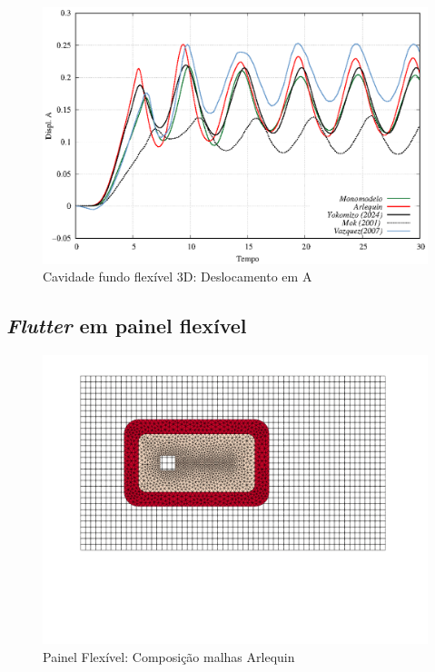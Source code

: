 \documentclass[tese_patricia]{subfiles}
\begin{document}
\begin{figure}[htb!]
	\centering 
	\includegraphics[scale=1.0,trim=0cm 0cm 0cm 0cm, clip=true]{Imagens/Cap7/Cav3dDisplacement.eps}	
	\caption{Cavidade fundo flexível 3D: Deslocamento em A}
	\label{fig:cavidadeFF2d_DeslocamentoemA}
\end{figure}


\subsection{\textit{Flutter} em painel flexível}

\begin{figure}[htb!]
	\centering 
	\includegraphics[scale=0.3,trim=0cm 11cm 2cm 0cm, clip=true]{Imagens/Cap7/prismaPF.pdf}	
	\caption{Painel Flexível: Composição malhas Arlequin}
	\label{fig:Painel:ComposiçãoMalha}
\end{figure}
\end{document}
